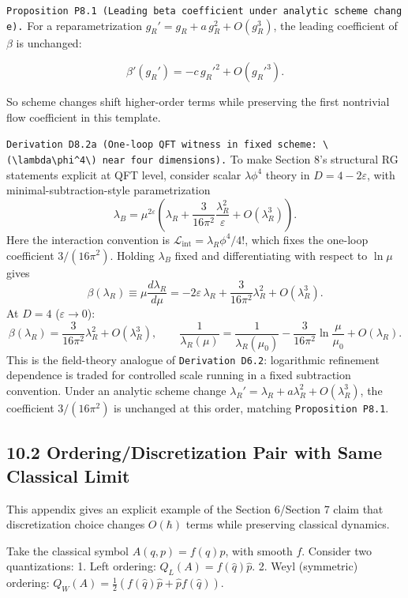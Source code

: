 \documentclass[
]{article}
\begin{document}
\texttt{Proposition\ P8.1\ (Leading\ beta\ coefficient\ under\ analytic\ scheme\ change).}
For a reparametrization \(g_R' = g_R + a\,g_R^2 + O(g_R^3)\), the
leading coefficient of \(\beta\) is unchanged:

\[
\beta'(g_R')=-c\,{g_R'}^2+O({g_R'}^3).
\]

So scheme changes shift higher-order terms while preserving the first
nontrivial flow coefficient in this template.

\texttt{Derivation\ D8.2a\ (One-loop\ QFT\ witness\ in\ fixed\ scheme:\ \textbackslash{}(\textbackslash{}lambda\textbackslash{}phi\^{}4\textbackslash{})\ near\ four\ dimensions).}
To make Section 8's structural RG statements explicit at QFT level,
consider scalar \(\lambda\phi^4\) theory in \(D=4-2\varepsilon\), with
minimal-subtraction-style parametrization \[
\lambda_B
=
\mu^{2\varepsilon}\!\left(
\lambda_R
+\frac{3}{16\pi^2}\frac{\lambda_R^2}{\varepsilon}
+O(\lambda_R^3)
\right).
\] Here the interaction convention is
\(\mathcal L_{\mathrm{int}}=\lambda_R\phi^4/4!\), which fixes the
one-loop coefficient \(3/(16\pi^2)\). Holding \(\lambda_B\) fixed and
differentiating with respect to \(\ln\mu\) gives \[
\beta(\lambda_R)\equiv \mu\frac{d\lambda_R}{d\mu}
=
-2\varepsilon\,\lambda_R
+\frac{3}{16\pi^2}\lambda_R^2
+O(\lambda_R^3).
\] At \(D=4\) (\(\varepsilon\to0\)): \[
\beta(\lambda_R)=\frac{3}{16\pi^2}\lambda_R^2+O(\lambda_R^3),
\qquad
\frac{1}{\lambda_R(\mu)}
=
\frac{1}{\lambda_R(\mu_0)}
-\frac{3}{16\pi^2}\ln\!\frac{\mu}{\mu_0}
+O(\lambda_R).
\] This is the field-theory analogue of \texttt{Derivation\ D6.2}:
logarithmic refinement dependence is traded for controlled scale running
in a fixed subtraction convention. Under an analytic scheme change
\(\lambda_R'=\lambda_R+a\lambda_R^2+O(\lambda_R^3)\), the coefficient
\(3/(16\pi^2)\) is unchanged at this order, matching
\texttt{Proposition\ P8.1}.

\hypertarget{orderingdiscretization-pair-with-same-classical-limit}{%
\subsection{10.2 Ordering/Discretization Pair with Same Classical
Limit}\label{orderingdiscretization-pair-with-same-classical-limit}}

This appendix gives an explicit example of the Section 6/Section 7 claim
that discretization choice changes \(O(\hbar)\) terms while preserving
classical dynamics.

Take the classical symbol \(A(q,p)=f(q)p\), with smooth \(f\). Consider
two quantizations: 1. Left ordering: \(Q_L(A)=f(\hat q)\hat p\). 2. Weyl
(symmetric) ordering:
\(Q_W(A)=\frac12\left(f(\hat q)\hat p+\hat p f(\hat q)\right)\).
\end{document}
